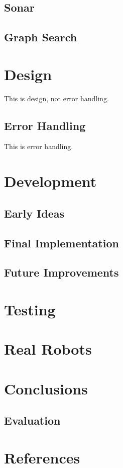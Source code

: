 \documentclass[a4paper,12pt]{article}
\begin{document}
\subsection{Sonar}
\subsection{Graph Search}
\section{Design}
This is design, not error handling.
\subsection{Error Handling}
This is error handling.
\section{Development}
\subsection{Early Ideas}
\subsection{Final Implementation}
\subsection{Future Improvements} %
\section{Testing}
\section{Real Robots}
\section{Conclusions}
\subsection{Evaluation}
\section{References}



\end{document}
